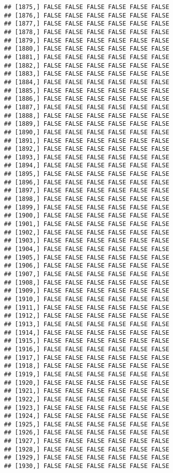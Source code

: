 \documentclass[
]{article}
\begin{document}
\begin{verbatim}
## [1875,] FALSE FALSE FALSE FALSE FALSE FALSE
## [1876,] FALSE FALSE FALSE FALSE FALSE FALSE
## [1877,] FALSE FALSE FALSE FALSE FALSE FALSE
## [1878,] FALSE FALSE FALSE FALSE FALSE FALSE
## [1879,] FALSE FALSE FALSE FALSE FALSE FALSE
## [1880,] FALSE FALSE FALSE FALSE FALSE FALSE
## [1881,] FALSE FALSE FALSE FALSE FALSE FALSE
## [1882,] FALSE FALSE FALSE FALSE FALSE FALSE
## [1883,] FALSE FALSE FALSE FALSE FALSE FALSE
## [1884,] FALSE FALSE FALSE FALSE FALSE FALSE
## [1885,] FALSE FALSE FALSE FALSE FALSE FALSE
## [1886,] FALSE FALSE FALSE FALSE FALSE FALSE
## [1887,] FALSE FALSE FALSE FALSE FALSE FALSE
## [1888,] FALSE FALSE FALSE FALSE FALSE FALSE
## [1889,] FALSE FALSE FALSE FALSE FALSE FALSE
## [1890,] FALSE FALSE FALSE FALSE FALSE FALSE
## [1891,] FALSE FALSE FALSE FALSE FALSE FALSE
## [1892,] FALSE FALSE FALSE FALSE FALSE FALSE
## [1893,] FALSE FALSE FALSE FALSE FALSE FALSE
## [1894,] FALSE FALSE FALSE FALSE FALSE FALSE
## [1895,] FALSE FALSE FALSE FALSE FALSE FALSE
## [1896,] FALSE FALSE FALSE FALSE FALSE FALSE
## [1897,] FALSE FALSE FALSE FALSE FALSE FALSE
## [1898,] FALSE FALSE FALSE FALSE FALSE FALSE
## [1899,] FALSE FALSE FALSE FALSE FALSE FALSE
## [1900,] FALSE FALSE FALSE FALSE FALSE FALSE
## [1901,] FALSE FALSE FALSE FALSE FALSE FALSE
## [1902,] FALSE FALSE FALSE FALSE FALSE FALSE
## [1903,] FALSE FALSE FALSE FALSE FALSE FALSE
## [1904,] FALSE FALSE FALSE FALSE FALSE FALSE
## [1905,] FALSE FALSE FALSE FALSE FALSE FALSE
## [1906,] FALSE FALSE FALSE FALSE FALSE FALSE
## [1907,] FALSE FALSE FALSE FALSE FALSE FALSE
## [1908,] FALSE FALSE FALSE FALSE FALSE FALSE
## [1909,] FALSE FALSE FALSE FALSE FALSE FALSE
## [1910,] FALSE FALSE FALSE FALSE FALSE FALSE
## [1911,] FALSE FALSE FALSE FALSE FALSE FALSE
## [1912,] FALSE FALSE FALSE FALSE FALSE FALSE
## [1913,] FALSE FALSE FALSE FALSE FALSE FALSE
## [1914,] FALSE FALSE FALSE FALSE FALSE FALSE
## [1915,] FALSE FALSE FALSE FALSE FALSE FALSE
## [1916,] FALSE FALSE FALSE FALSE FALSE FALSE
## [1917,] FALSE FALSE FALSE FALSE FALSE FALSE
## [1918,] FALSE FALSE FALSE FALSE FALSE FALSE
## [1919,] FALSE FALSE FALSE FALSE FALSE FALSE
## [1920,] FALSE FALSE FALSE FALSE FALSE FALSE
## [1921,] FALSE FALSE FALSE FALSE FALSE FALSE
## [1922,] FALSE FALSE FALSE FALSE FALSE FALSE
## [1923,] FALSE FALSE FALSE FALSE FALSE FALSE
## [1924,] FALSE FALSE FALSE FALSE FALSE FALSE
## [1925,] FALSE FALSE FALSE FALSE FALSE FALSE
## [1926,] FALSE FALSE FALSE FALSE FALSE FALSE
## [1927,] FALSE FALSE FALSE FALSE FALSE FALSE
## [1928,] FALSE FALSE FALSE FALSE FALSE FALSE
## [1929,] FALSE FALSE FALSE FALSE FALSE FALSE
## [1930,] FALSE FALSE FALSE FALSE FALSE FALSE

\end{verbatim}
\end{document}
